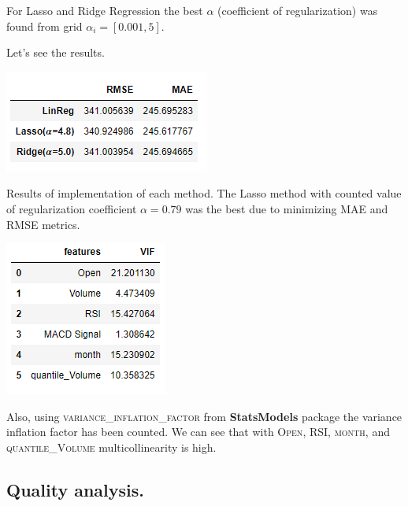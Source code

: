 \documentclass[%
12pt, %
final, %
oneside, %
onecolumn, %
centertags]{article} %
\theoremstyle{plain}
\theoremstyle{definition}
\theoremstyle{remark}
\begin{document}
For Lasso and Ridge Regression the best $\alpha$ (coefficient of regularization) was found from grid $\alpha_i = [0.001, 5]$. 

Let's see the results.

\begin{center}
\includegraphics[scale=0.8]{images/results_reg.png}

Results of implementation of each method. The Lasso method with counted value of regularization coefficient $\alpha=0.79$ was the best due to minimizing \textsc{MAE} and \textsc{RMSE} metrics.
\end{center}

\begin{center}
\includegraphics[scale=0.9]{images/vif_data.png}

Also, using \textsc{variance\_inflation\_factor} from \textbf{StatsModels} package the variance inflation factor has been counted. We can see that with \textsc{Open}, \textsc{RSI}, \textsc{month}, and \textsc{quantile\_Volume} multicollinearity is high.
\end{center}

\subsection{Quality analysis.}
\end{document}
